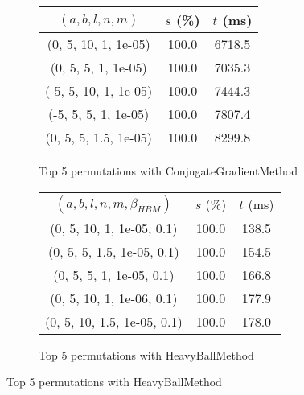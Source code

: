 \begin{figure}[H]
\begin{subfigure}[ht]{.5\textwidth}
\begin{tabular}{|c|c|c|}
\hline
\rowcolor{gray!25}
$(a,b,l,n,m)$ & $s$ (\%) & $t$ (ms) \\
\hline
(0, 5, 10, 1, 1e-05) & 100.0 & 6718.5 \\
(0, 5, 5, 1, 1e-05) & 100.0 & 7035.3 \\
(-5, 5, 10, 1, 1e-05) & 100.0 & 7444.3 \\
(-5, 5, 5, 1, 1e-05) & 100.0 & 7807.4 \\
(0, 5, 5, 1.5, 1e-05) & 100.0 & 8299.8 \\
\hline
\end{tabular}
\caption{Top 5 permutations with ConjugateGradientMethod}
\label{subfig:param_comp_NegativeEntropy_ConjugateGradientMethod_UniformSearch}
\end{subfigure}
\hfill
\begin{subfigure}[ht]{.5\textwidth}
\begin{tabular}{|c|c|c|}
\hline
\rowcolor{gray!25}
\multicolumn{3}{|c|}{HeavyBallMethod} \\
\hline
\rowcolor{gray!25}
$(a,b,l,n,m,\beta_{HBM})$ & $s$ (\%) & $t$ (ms) \\
\hline
(0, 5, 10, 1, 1e-05, 0.1) & 100.0 & 138.5 \\
(0, 5, 5, 1.5, 1e-05, 0.1) & 100.0 & 154.5 \\
(0, 5, 5, 1, 1e-05, 0.1) & 100.0 & 166.8 \\
(0, 5, 10, 1, 1e-06, 0.1) & 100.0 & 177.9 \\
(0, 5, 10, 1.5, 1e-05, 0.1) & 100.0 & 178.0 \\
\hline
\end{tabular}
\caption{Top 5 permutations with HeavyBallMethod}
\label{subfig:param_comp_NegativeEntropy_HeavyBallMethod_UniformSearch}
\end{subfigure}
\end{figure}
\restoregeometry